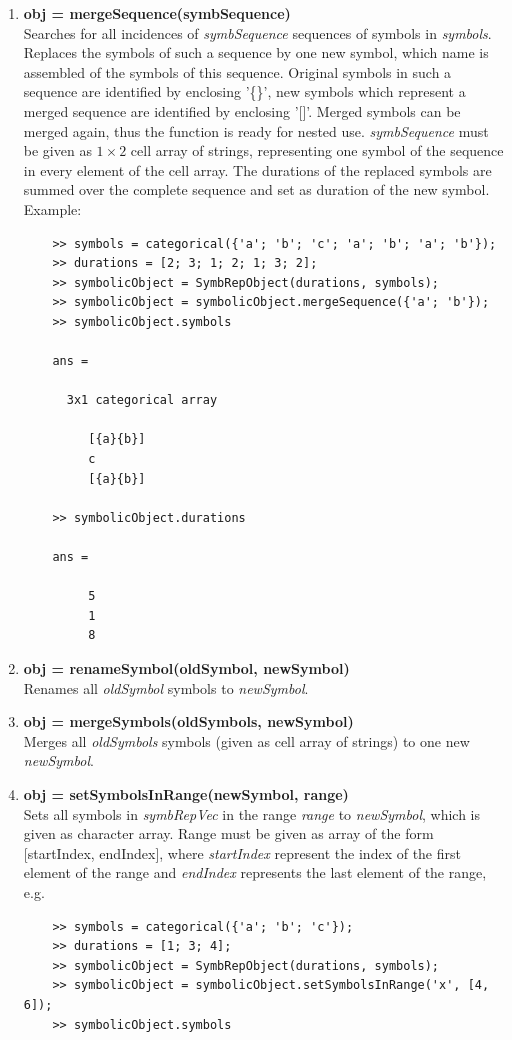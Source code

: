 \documentclass[a4]{scrreprt}
\begin{document}
\begin{enumerate}
	\item \textbf{obj = mergeSequence(symbSequence)}\\
	Searches for all incidences of \textit{symbSequence} sequences of symbols in \textit{symbols}. Replaces the symbols of such a sequence by one new symbol, which name is assembled of the symbols of this sequence. Original symbols in such a sequence are identified by enclosing '\{\}', new symbols which represent a merged sequence are identified by enclosing '[]'. Merged symbols can be merged again, thus the function is ready for nested use. \textit{symbSequence} must be given as $1 \times 2$ cell array of strings, representing one symbol of the sequence in every element of the cell array. The durations of the replaced symbols are summed over the complete sequence and set as duration of the new symbol.
	Example:
	\begin{verbatim}
	>> symbols = categorical({'a'; 'b'; 'c'; 'a'; 'b'; 'a'; 'b'});
	>> durations = [2; 3; 1; 2; 1; 3; 2];
	>> symbolicObject = SymbRepObject(durations, symbols);
	>> symbolicObject = symbolicObject.mergeSequence({'a'; 'b'});
	>> symbolicObject.symbols
	
	ans = 
	
	  3x1 categorical array
	
	     [{a}{b}] 
	     c 
	     [{a}{b}] 
	
	>> symbolicObject.durations
	
	ans =
	
	     5
	     1
	     8	
	\end{verbatim}
	
	\item \textbf{obj = renameSymbol(oldSymbol, newSymbol)}\\
	Renames all \textit{oldSymbol} symbols to \textit{newSymbol}.
	
	\item \textbf{obj = mergeSymbols(oldSymbols, newSymbol)}\\
	Merges all \textit{oldSymbols} symbols (given as cell array of strings) to one new \textit{newSymbol}.
	
	\item \textbf{obj = setSymbolsInRange(newSymbol, range)}\\
	Sets all symbols in \textit{symbRepVec} in the range \textit{range} to \textit{newSymbol}, which is given as character array. Range must be given as array of the form [startIndex, endIndex], where \textit{startIndex} represent the index of the first element of the range and \textit{endIndex} represents the last element of the range, e.g.
	\begin{verbatim}
	>> symbols = categorical({'a'; 'b'; 'c'});
	>> durations = [1; 3; 4];
	>> symbolicObject = SymbRepObject(durations, symbols);
	>> symbolicObject = symbolicObject.setSymbolsInRange('x', [4, 6]);
	>> symbolicObject.symbols
	

\end{verbatim}
\end{enumerate}
\end{document}
